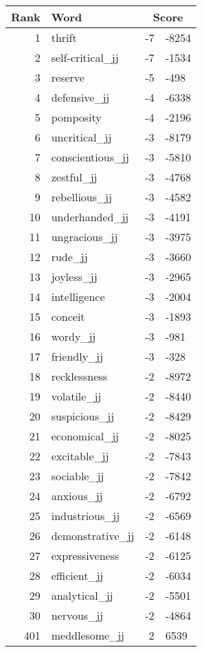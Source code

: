\begin{longtable}[!htbp]{| rlr@{.}l |}
    \hline
    \textbf{Rank} & \textbf{Word} & \multicolumn{2}{c|}{\textbf{Score}} \\
    \hline
    \endhead
    1 & thrift & -7 & -8254 \\
    2 & self-critical\_jj & -7 & -1534 \\
    3 & reserve & -5 & -498 \\
    4 & defensive\_jj & -4 & -6338 \\
    5 & pomposity & -4 & -2196 \\
    6 & uncritical\_jj & -3 & -8179 \\
    7 & conscientious\_jj & -3 & -5810 \\
    8 & zestful\_jj & -3 & -4768 \\
    9 & rebellious\_jj & -3 & -4582 \\
    10 & underhanded\_jj & -3 & -4191 \\
    11 & ungracious\_jj & -3 & -3975 \\
    12 & rude\_jj & -3 & -3660 \\
    13 & joyless\_jj & -3 & -2965 \\
    14 & intelligence & -3 & -2004 \\
    15 & conceit & -3 & -1893 \\
    16 & wordy\_jj & -3 & -981 \\
    17 & friendly\_jj & -3 & -328 \\
    18 & recklessness & -2 & -8972 \\
    19 & volatile\_jj & -2 & -8440 \\
    20 & suspicious\_jj & -2 & -8429 \\
    21 & economical\_jj & -2 & -8025 \\
    22 & excitable\_jj & -2 & -7843 \\
    23 & sociable\_jj & -2 & -7842 \\
    24 & anxious\_jj & -2 & -6792 \\
    25 & industrious\_jj & -2 & -6569 \\
    26 & demonstrative\_jj & -2 & -6148 \\
    27 & expressiveness & -2 & -6125 \\
    28 & efficient\_jj & -2 & -6034 \\
    29 & analytical\_jj & -2 & -5501 \\
    30 & nervous\_jj & -2 & -4864 \\
    401 & meddlesome\_jj & 2 & 6539 \\

\end{longtable}
